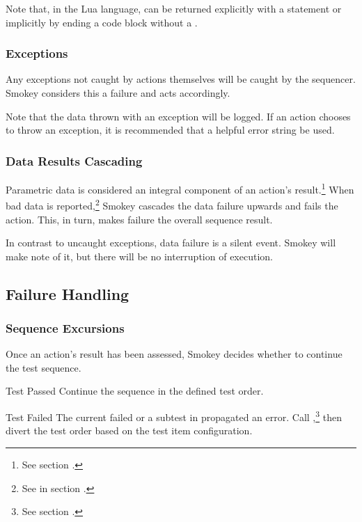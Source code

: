 Note that, in the Lua language,  can be returned explicitly with a
 statement or implicitly by ending a code block without a
.

\subsubsection{Exceptions}

Any exceptions not caught by actions themselves will be caught by the
sequencer.  Smokey considers this a failure and acts accordingly.

Note that the data thrown with an exception will be logged.  If an action
chooses to throw an exception, it is recommended that a helpful error string be
used.

\subsubsection{Data Results Cascading}
\label{sec:DataCascading}

Parametric data is considered an integral component of an action's
result.\footnote{See section .} When bad data is
reported,\footnote{See  in section
.} Smokey cascades the data failure upwards and fails
the action.  This, in turn, makes failure the overall sequence result.

In contrast to uncaught exceptions, data failure is a silent event.  Smokey
will make note of it, but there will be no interruption of execution.

\subsection{Failure Handling}
\label{sec:FailureHandling}

\subsubsection{Sequence Excursions}

Once an action's result has been assessed, Smokey decides whether to continue
the test sequence.

\begin{Descriptive}

	\item[Test Passed] Continue the sequence in the defined test order.

	\item[Test Failed] The current  failed or a
	subtest in  propagated an error.  Call
	,\footnote{See section
	.} then divert the test order based on
	the test item configuration.

\end{Descriptive}


